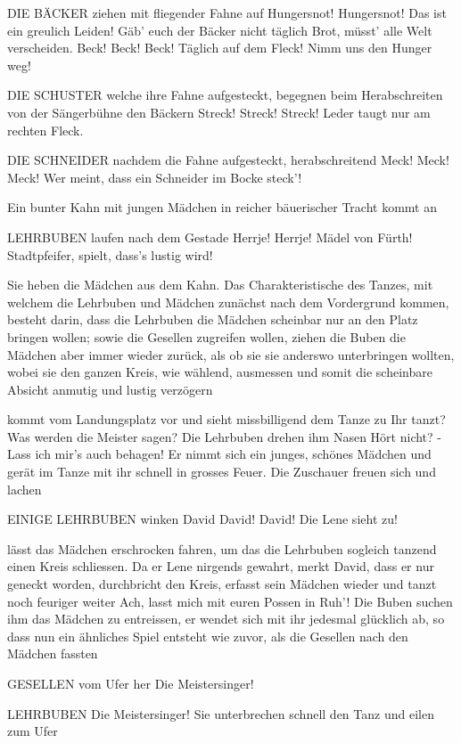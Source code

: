 \begin{drama}
DIE BÄCKER
ziehen mit fliegender Fahne auf
Hungersnot! Hungersnot!
Das ist ein greulich Leiden!
Gäb' euch der Bäcker nicht täglich Brot,
müsst' alle Welt verscheiden.
Beck! Beck! Beck!
Täglich auf dem Fleck!
Nimm uns den Hunger weg!

DIE SCHUSTER
welche ihre Fahne aufgesteckt, begegnen beim Herabschreiten von der Sängerbühne den Bäckern
Streck! Streck! Streck!
Leder taugt nur am rechten Fleck.

DIE SCHNEIDER
nachdem die Fahne aufgesteckt, herabschreitend
Meck! Meck! Meck!
Wer meint, dass ein Schneider im Bocke steck'!

Ein bunter Kahn mit jungen Mädchen in reicher bäuerischer Tracht kommt an

LEHRBUBEN
laufen nach dem Gestade
Herrje! Herrje! Mädel von Fürth!
Stadtpfeifer, spielt, dass's lustig wird!

Sie heben die Mädchen aus dem Kahn. Das Charakteristische des Tanzes, mit welchem die Lehrbuben und Mädchen zunächst nach dem Vordergrund kommen, besteht darin, dass die Lehrbuben die Mädchen scheinbar nur an den Platz bringen wollen; sowie die Gesellen zugreifen wollen, ziehen die Buben die Mädchen aber immer wieder zurück, als ob sie sie anderswo unterbringen wollten, wobei sie den ganzen Kreis, wie wählend, ausmessen und somit die scheinbare Absicht anmutig und lustig verzögern

\Davidspeaks
kommt vom Landungsplatz vor und sieht missbilligend dem Tanze zu
Ihr tanzt? Was werden die Meister sagen?
Die Lehrbuben drehen ihm Nasen
Hört nicht? - Lass ich mir's auch behagen!
Er nimmt sich ein junges, schönes Mädchen und gerät im Tanze mit ihr schnell in grosses Feuer. Die Zuschauer freuen sich und lachen

EINIGE LEHRBUBEN
winken David
David! David! Die Lene sieht zu!

\Davidspeaks
lässt das Mädchen erschrocken fahren, um das die Lehrbuben sogleich tanzend einen Kreis schliessen. Da er Lene nirgends gewahrt, merkt David, dass er nur geneckt worden, durchbricht den Kreis, erfasst sein Mädchen wieder und tanzt noch feuriger weiter
Ach, lasst mich mit euren Possen in Ruh'!
Die Buben suchen ihm das Mädchen zu entreissen, er wendet sich mit ihr jedesmal glücklich ab, so dass nun ein ähnliches Spiel entsteht wie zuvor, als die Gesellen nach den Mädchen fassten

GESELLEN
vom Ufer her
Die Meistersinger!

LEHRBUBEN
Die Meistersinger!
Sie unterbrechen schnell den Tanz und eilen zum Ufer


\end{drama}
